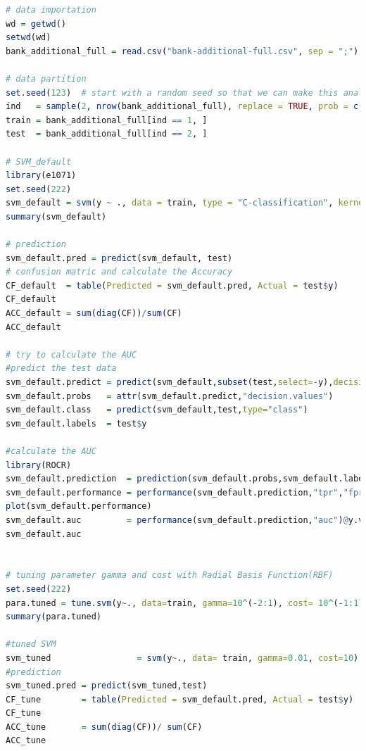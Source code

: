 \documentclass[12pt, a4paper, bibliography=totoc, english]{scrartcl}
\begin{document}
\begin{lstlisting}[language = R]
# data importation
wd = getwd()
setwd(wd)
bank_additional_full = read.csv("bank-additional-full.csv", sep = ";")

# data partition
set.seed(123)  # start with a random seed so that we can make this analysis repeatable 
ind   = sample(2, nrow(bank_additional_full), replace = TRUE, prob = c(0.8, 0.2))
train = bank_additional_full[ind == 1, ]
test  = bank_additional_full[ind == 2, ]

# SVM_default
library(e1071)
set.seed(222)
svm_default = svm(y ~ ., data = train, type = "C-classification", kernel = "radial", probability = TRUE)
summary(svm_default)

# prediction
svm_default.pred = predict(svm_default, test)
# confusion matric and calculate the Accuracy
CF_default  = table(Predicted = svm_default.pred, Actual = test$y)
CF_default
ACC_default = sum(diag(CF))/sum(CF)
ACC_default

# try to calculate the AUC
#predict the test data
svm_default.predict = predict(svm_default,subset(test,select=-y),decision.values=TRUE)
svm_default.probs   = attr(svm_default.predict,"decision.values")
svm_default.class   = predict(svm_default,test,type="class")
svm_default.labels  = test$y

#calculate the AUC
library(ROCR)
svm_default.prediction  = prediction(svm_default.probs,svm_default.labels)
svm_default.performance = performance(svm_default.prediction,"tpr","fpr")
plot(svm_default.performance)
svm_default.auc         = performance(svm_default.prediction,"auc")@y.values[[1]]
svm_default.auc


# tuning parameter gamma and cost with Radial Basis Function(RBF) 
set.seed(222) 
para.tuned = tune.svm(y~., data=train, gamma=10^(-2:1), cost= 10^(-1:1)) # It would take lots of time to run this code since it contains the 10-fold cv.
summary(para.tuned) 

#tuned SVM 
svm_tuned                 = svm(y~., data= train, gamma=0.01, cost=10) 
#prediction
svm_tuned.pred = predict(svm_tuned,test) 
CF_tune        = table(Predicted = svm_default.pred, Actual = test$y) 
CF_tune
ACC_tune       = sum(diag(CF))/ sum(CF) 
ACC_tune
\end{lstlisting}
\end{document}
